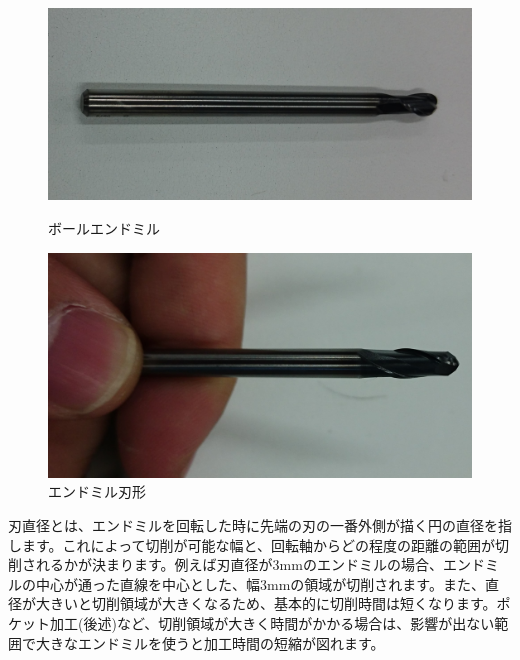 \documentclass[b5paper, 9pt, twocolumn, titlepage,openany]{jsbook}%
\begin{document}
\begin{figure}[tbh]
  \begin{center}
    \begin{minipage}{0.4\columnwidth}
      \includegraphics[width=\columnwidth]{bollendmill.jpg}
      \caption{ボールエンドミル    \label{bollendmill1}}
    \end{minipage}
    \hspace{0.05\columnwidth}
    \begin{minipage}{0.4\columnwidth}
      \includegraphics[width=\columnwidth]{bollendmill_side.jpg}
      \caption{エンドミル刃形    \label{bollendmill2}}
    \end{minipage}
  \end{center}
\end{figure}


刃直径とは、エンドミルを回転した時に先端の刃の一番外側が描く円の直径を指します。これによって切削が可能な幅と、回転軸からどの程度の距離の範囲が切削されるかが決まります。例えば刃直径が3mmのエンドミルの場合、エンドミルの中心が通った直線を中心とした、幅3mmの領域が切削されます。また、直径が大きいと切削領域が大きくなるため、基本的に切削時間は短くなります。ポケット加工(後述)など、切削領域が大きく時間がかかる場合は、影響が出ない範囲で大きなエンドミルを使うと加工時間の短縮が図れます。
\end{document}
